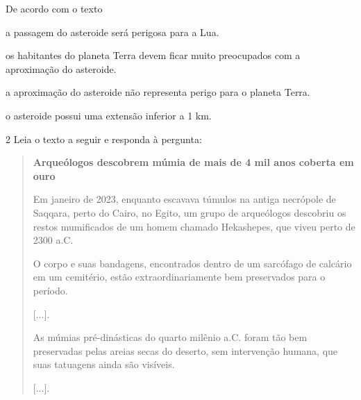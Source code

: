 De acordo com o texto

\begin{escolha}
\item a passagem do asteroide será perigosa para a Lua.

\item os habitantes do planeta Terra devem ficar muito preocupados com a
aproximação do asteroide.

\item a aproximação do asteroide não representa perigo para o planeta
Terra.

\item o asteroide possui uma extensão inferior a 1 km.
\end{escolha}


\num{2} Leia o texto a seguir e responda à pergunta:

\begin{quote}
\textbf{Arqueólogos descobrem múmia de mais de 4 mil anos coberta em ouro}

Em janeiro de 2023, enquanto escavava túmulos na antiga necrópole de
Saqqara, perto do Cairo, no Egito, um grupo de arqueólogos descobriu os
restos mumificados de um homem chamado Hekashepes, que viveu perto de
2300 a.C.

O corpo e suas bandagens, encontrados dentro de um sarcófago de calcário
em um cemitério, estão extraordinariamente bem preservados para o
período.

{[}...{]}.

As múmias pré-dinásticas do quarto milênio a.C. foram tão bem
preservadas pelas areias secas do deserto, sem intervenção humana, que
suas tatuagens ainda são visíveis.

{[}...{]}.

\end{quote}


